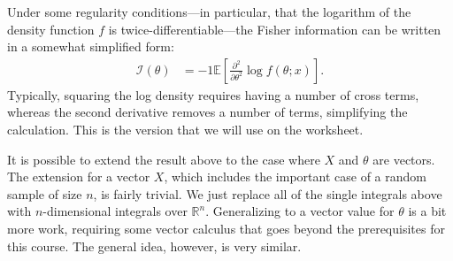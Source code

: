 \documentclass{tufte-handout}
\begin{document}
Under some regularity conditions---in particular, that the logarithm of the
density function $f$ is twice-differentiable---the Fisher information can be
written in a somewhat simplified form:
\begin{align*}
\mathcal{I}(\theta) &= -1 \mathbb{E} \left[ \frac{\partial^2}{\partial \theta^2} \log f(\theta; x) \right].
\end{align*}
Typically, squaring the log density requires having a number of cross terms,
whereas the second derivative removes a number of terms, simplifying the 
calculation. This is the version that we will use on the worksheet.

\vspace*{18pt}

\noindent
It is possible to extend the result above to the case where $X$ and $\theta$
are vectors. The extension for a vector $X$, which includes the important case
of a random sample of size $n$, is fairly trivial. We just replace all of the
single integrals above with $n$-dimensional integrals over $\mathbb{R}^n$. 
Generalizing to a vector value for $\theta$ is a bit more work, requiring 
some vector calculus that goes beyond the prerequisites for this course. 
The general idea, however, is very similar.
\end{document}
